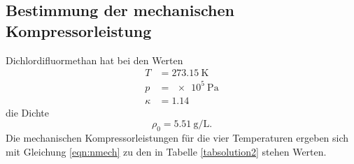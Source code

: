 \subsection{Bestimmung der mechanischen Kompressorleistung}
Dichlordifluormethan hat bei den Werten
\begin{align*}
    T &= \SI{273.15}{\kelvin} \\
    p &= \SI{e5}{\pascal} \\
    \kappa &= \num{1.14}
\end{align*}
die Dichte 
\begin{equation*}
    \rho_0 = \SI{5.51}{\gram\per\liter}.
\end{equation*}
Die mechanischen Kompressorleistungen für die vier Temperaturen
ergeben sich mit Gleichung \eqref{eqn:nmech}
zu den in Tabelle \ref{tabsolution2} stehen Werten.
